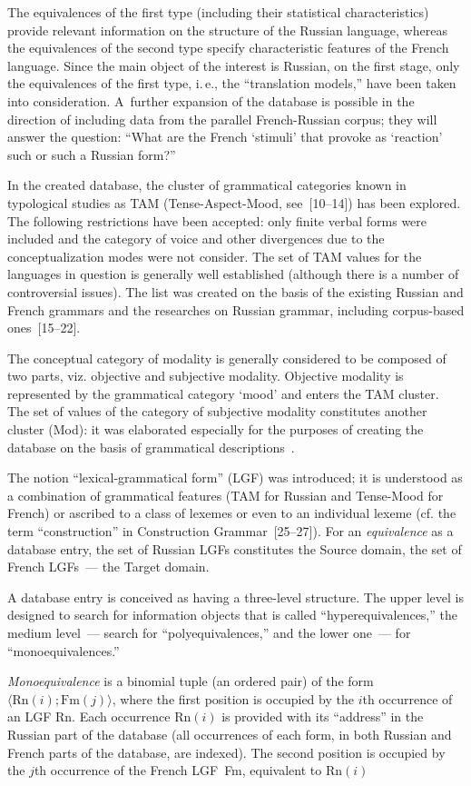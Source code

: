 \begin{multicols}{2}
   The equivalences of the first type (including their statistical characteristics) provide relevant 
information on the structure of the Russian language, whereas the equivalences of the second type 
specify characteristic features of the French language. Since the main object of the  interest is 
Russian, on the first stage, only the equivalences of the first type, i.\,e., the 
``translation models,'' have been taken into consideration. 
 A~further expansion of the database is possible in the direction of including 
data from the parallel French-Russian corpus; they will answer the question: ``What are the French 
`stimuli' that provoke as `reaction' such or such a Russian form?''
   
   In the created database, the cluster of grammatical categories known in typological studies as 
TAM (Tense-Aspect-Mood, see~[10--14]) has been explored. The following restrictions have been
accepted: only 
finite verbal forms were included and the category of voice and other divergences due to the 
conceptualization modes were not consider. The set of TAM values for the languages in question is generally well 
established (although there is a number of controversial issues). The list was created on the basis of 
the existing Russian and French grammars and the researches on Russian grammar, including 
corpus-based ones~[15--22].
   
   The conceptual category of modality is generally considered to be composed of two parts, viz. 
objective and subjective modality. Objective modality is represented by the grammatical category 
`mood' and enters the TAM cluster. The set of values of the category of subjective modality 
constitutes another cluster (Mod): it was elaborated especially for the purposes of creating the 
database on the basis of grammatical descriptions~\cite{15-zat, 16-zat, 23-zat, 24-zat}.
   
   The notion ``lexical-grammatical form'' (LGF) was introduced; it is understood as a 
combination of grammatical features (TAM for Russian and Tense-Mood for 
French) or ascribed to a class of lexemes or even to an individual lexeme (cf. the term 
``construction'' in Construction Grammar~[25--27]). For an \textit{equivalence} as a database 
entry, the set of Russian LGFs constitutes the Source domain, the set of French LGFs~--- the Target 
domain. 
   
   A database entry is conceived as having a three-level structure. The upper level is designed to 
search for information objects that is called ``hyperequivalences,'' the medium level~--- search 
for ``polyequivalences,'' and the lower one~--- for ``monoequivalences.''


   
   \textit{Monoequivalence} is a binomial tuple (an ordered pair) of the form $\langle \mathrm{Rn}(i); 
\mathrm{Fm}(j)\rangle$, where the first position is occupied by the $i$th occurrence of an LGF Rn. Each 
occurrence $\mathrm{Rn}(i)$ is provided with its ``address'' in the Russian part of the database (all 
occurrences of each form, in both Russian and French parts of the database,
are indexed). The 
second position is occupied by the $j$th
occurrence of the French LGF~Fm, equivalent to 
$\mathrm{Rn}(i)$
\end{multicols}
